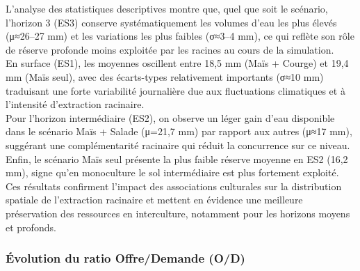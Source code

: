 \documentclass[
]{article}
\begin{document}
L'analyse des statistiques descriptives montre que, quel que soit le
scénario, l'horizon 3 (ES3) conserve systématiquement les volumes d'eau
les plus élevés (μ≈26--27 mm) et les variations les plus faibles (σ≈3--4
mm), ce qui reflète son rôle de réserve profonde moins exploitée par les
racines au cours de la simulation.\\
En surface (ES1), les moyennes oscillent entre 18,5 mm (Maïs + Courge)
et 19,4 mm (Maïs seul), avec des écarts-types relativement importants
(σ≈10 mm) traduisant une forte variabilité journalière due aux
fluctuations climatiques et à l'intensité d'extraction racinaire.\\
Pour l'horizon intermédiaire (ES2), on observe un léger gain d'eau
disponible dans le scénario Maïs + Salade (μ=21,7 mm) par rapport aux
autres (μ≈17 mm), suggérant une complémentarité racinaire qui réduit la
concurrence sur ce niveau.\\
Enfin, le scénario Maïs seul présente la plus faible réserve moyenne en
ES2 (16,2 mm), signe qu'en monoculture le sol intermédiaire est plus
fortement exploité. Ces résultats confirment l'impact des associations
culturales sur la distribution spatiale de l'extraction racinaire et
mettent en évidence une meilleure préservation des ressources en
interculture, notamment pour les horizons moyens et profonds.

\subsubsection{Évolution du ratio Offre/Demande
(O/D)}\label{uxe9volution-du-ratio-offredemande-od}
\end{document}
